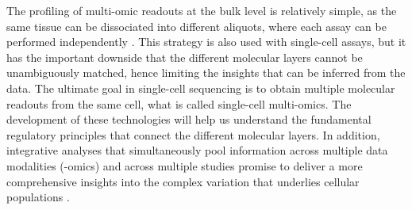 The profiling of multi-omic readouts at the bulk level is relatively simple, as the same tissue can be dissociated into different aliquots, where each assay can be performed independently \cite{Ritchie2015}. This strategy is also used with single-cell assays, but it has the important downside that the different molecular layers cannot be unambiguously matched, hence limiting the insights that can be inferred from the data. The ultimate goal in single-cell sequencing is to obtain multiple molecular readouts from the same cell, what is called single-cell multi-omics. The development of these technologies will help us understand the fundamental regulatory principles that connect the different molecular layers. In addition, integrative analyses that simultaneously pool information across multiple data modalities (-omics) and across multiple studies promise to deliver a more comprehensive insights into the complex variation that underlies cellular populations .

